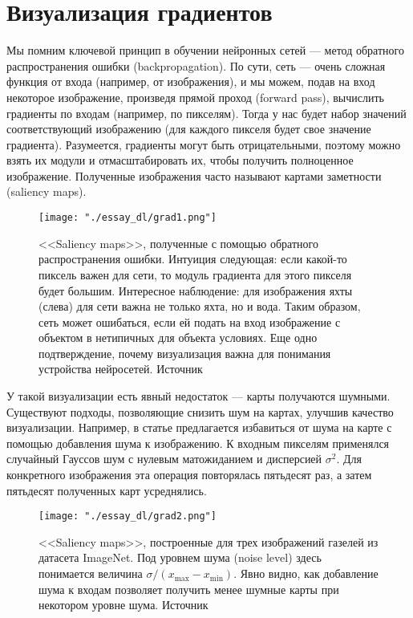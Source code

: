 \documentclass[12pt,fleqn]{article}
\begin{document}
\section{Визуализация градиентов}

Мы помним ключевой принцип в обучении нейронных сетей --- метод обратного распространения ошибки (backpropagation). По сути, сеть --- очень сложная функция от входа (например, от изображения), и мы можем, подав на вход некоторое изображение, произведя прямой проход (forward pass), вычислить градиенты по входам (например, по пикселям). Тогда у нас будет набор значений соответствующий изображению (для каждого пикселя будет свое значение градиента). Разумеется, градиенты могут быть отрицательными, поэтому можно взять их модули и отмасштабировать их, чтобы получить полноценное изображение. Полученные изображения часто называют картами заметности (saliency maps).

\begin{figure}[H]
\centering
\texttt{[image: "./essay\_dl/grad1.png"]}
\caption{<<Saliency maps>>, полученные с помощью обратного распространения ошибки. Интуиция следующая: если какой-то пиксель важен для сети, то модуль градиента для этого пикселя будет большим. Интересное наблюдение: для изображения яхты (слева) для сети важна не только яхта, но и вода. Таким образом, сеть может ошибаться, если ей подать на вход изображение с объектом в нетипичных для объекта условиях. Еще одно подтверждение, почему визуализация важна для понимания устройства нейросетей. Источник \cite{grad1}}
\end{figure}

У такой визуализации есть явный недостаток --- карты получаются шумными. Существуют подходы, позволяющие снизить шум на картах, улучшив качество визуализации. Например, в статье \cite{grad2} предлагается избавиться от шума на карте с помощью добавления шума к изображению. К входным пикселям применялся случайный Гауссов шум с нулевым матожиданием и дисперсией $\sigma ^ 2$. Для конкретного изображения эта операция повторялась пятьдесят раз, а затем пятьдесят полученных карт усреднялись.

\begin{figure}[H]
\centering
\texttt{[image: "./essay\_dl/grad2.png"]}
\caption{<<Saliency maps>>, построенные для трех изображений газелей из датасета ImageNet. Под уровнем шума (noise level) здесь понимается величина $\sigma / (x_{\max} - x_{\min})$. Явно видно, как добавление шума к входам позволяет получить менее шумные карты при некотором уровне шума. Источник \cite{grad2}}
\end{figure} 
\end{document}
